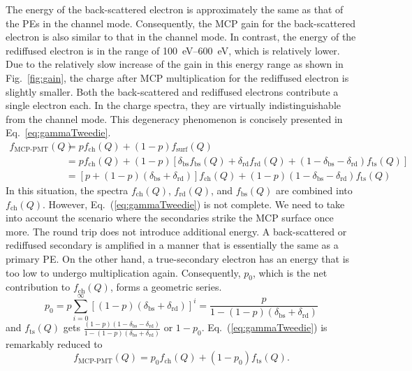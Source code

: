 The energy of the back-scattered electron is approximately the same as that of the PEs in the channel mode. Consequently, the MCP gain for the back-scattered electron is also similar to that in the channel mode. In contrast, the energy of the rediffused electron is in the range of \SIrange{100}{600}{eV}, which is relatively lower. Due to the relatively slow increase of the gain in this energy range as shown in Fig.~\ref{fig:gain}, the charge after MCP multiplication for the rediffused electron is slightly smaller.
Both the back-scattered and rediffused electrons contribute a single electron each. In the charge spectra, they are virtually indistinguishable from the channel mode. This degeneracy phenomenon is concisely presented in Eq.~\eqref{eq:gammaTweedie}.
\begin{equation}
	\label{eq:gammaTweedie}
	\begin{aligned}
		f_{\text{MCP-PMT}}(Q) & = p f_{\mathrm{ch}}(Q) + (1-p) f_{\mathrm{surf}}(Q)                                                                                                                                    \\
		                      & = p f_{\mathrm{ch}}(Q)+(1-p) [\delta_{\mathrm{bs}} f_{\mathrm{bs}}(Q) + \delta_{\mathrm{rd}} f_{\mathrm{rd}}(Q) + (1- \delta_{\mathrm{bs}} - \delta_{\mathrm{rd}}) f_{\mathrm{ts}}(Q)] \\
		                      & = [p + (1-p)(\delta_{\mathrm{bs}} + \delta_{\mathrm{rd}})] f_{\mathrm{ch}}(Q) + (1-p)(1-\delta_{\mathrm{bs}} - \delta_{\mathrm{rd}})f_{\mathrm{ts}}(Q)
	\end{aligned}
\end{equation}
In this situation, the spectra \(f_{\mathrm{ch}}(Q)\), \(f_{\mathrm{rd}}(Q)\), and \(f_{\mathrm{bs}}(Q)\) are combined into \(f_{\mathrm{ch}}(Q)\). However, Eq.~(\ref{eq:gammaTweedie}) is not complete. We need to take into account the scenario where the secondaries strike the MCP surface once more. The round trip does not introduce additional energy. A back-scattered or rediffused secondary is amplified in a manner that is essentially the same as a primary PE. On the other hand, a true-secondary electron has an energy that is too low to undergo multiplication again. Consequently, \(p_0\), which is the net contribution to \(f_{\mathrm{ch}}(Q)\), forms a geometric series.
\begin{equation}
	\label{eq:p0}
	p_0 = p \sum_{{i}=0}^\infty [(1-p) (\delta_{\mathrm{bs}} + \delta_{\mathrm{rd}})]^{i} = \frac{p}{1 - (1-p) (\delta_{\mathrm{bs}} + \delta_{\mathrm{rd}})}
\end{equation}
and \(f_{\mathrm{ts}}(Q)\) gets \(\frac{(1-p)(1-\delta_{\mathrm{bs}} - \delta_{\mathrm{rd}})}{1 - (1-p) (\delta_{\mathrm{bs}} + \delta_{\mathrm{rd}})}\) or \(1-p_0\).
Eq.~(\ref{eq:gammaTweedie}) is remarkably reduced to
\begin{equation}
	\label{eq:1}
	f_{\text{MCP-PMT}}(Q) = p_0 f_{\mathrm{ch}}(Q) + (1-p_0) f_{\mathrm{ts}}(Q).
\end{equation}

